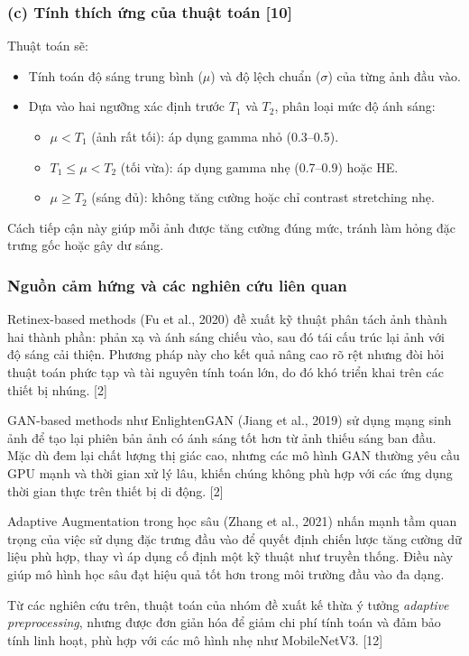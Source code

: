 \subsubsection*{(c) Tính thích ứng của thuật toán [10]}
Thuật toán sẽ:
\begin{itemize}[]
    \item Tính toán độ sáng trung bình ($\mu$) và độ lệch chuẩn ($\sigma$) của từng ảnh đầu vào.
    \item Dựa vào hai ngưỡng xác định trước $T_1$ và $T_2$, phân loại mức độ ánh sáng:
    \begin{itemize}[]
        \item $\mu < T_1$ (ảnh rất tối): áp dụng gamma nhỏ (0.3--0.5).
        \item $T_1 \le \mu < T_2$ (tối vừa): áp dụng gamma nhẹ (0.7--0.9) hoặc HE.
        \item $\mu \ge T_2$ (sáng đủ): không tăng cường hoặc chỉ contrast stretching nhẹ.
    \end{itemize}
\end{itemize}
Cách tiếp cận này giúp mỗi ảnh được tăng cường đúng mức, tránh làm hỏng đặc trưng gốc hoặc gây dư sáng.

\subsubsection{Nguồn cảm hứng và các nghiên cứu liên quan} %

Retinex-based methods (Fu et al., 2020) đề xuất kỹ thuật phân tách ảnh thành hai thành phần: phản xạ và ánh sáng chiếu vào, sau đó tái cấu trúc lại ảnh với độ sáng cải thiện. Phương pháp này cho kết quả nâng cao rõ rệt nhưng đòi hỏi thuật toán phức tạp và tài nguyên tính toán lớn, do đó khó triển khai trên các thiết bị nhúng. [2]

GAN-based methods như EnlightenGAN (Jiang et al., 2019) sử dụng mạng sinh ảnh để tạo lại phiên bản ảnh có ánh sáng tốt hơn từ ảnh thiếu sáng ban đầu. Mặc dù đem lại chất lượng thị giác cao, nhưng các mô hình GAN thường yêu cầu GPU mạnh và thời gian xử lý lâu, khiến chúng không phù hợp với các ứng dụng thời gian thực trên thiết bị di động. [2]

Adaptive Augmentation trong học sâu (Zhang et al., 2021) nhấn mạnh tầm quan trọng của việc sử dụng đặc trưng đầu vào để quyết định chiến lược tăng cường dữ liệu phù hợp, thay vì áp dụng cố định một kỹ thuật như truyền thống. Điều này giúp mô hình học sâu đạt hiệu quả tốt hơn trong môi trường đầu vào đa dạng.

Từ các nghiên cứu trên, thuật toán của nhóm đề xuất kế thừa ý tưởng \textit{adaptive preprocessing}, nhưng được đơn giản hóa để giảm chi phí tính toán và đảm bảo tính linh hoạt, phù hợp với các mô hình nhẹ như MobileNetV3. [12]
